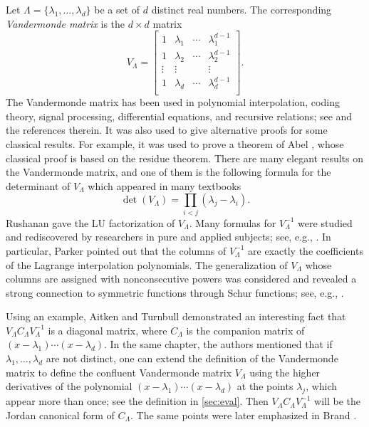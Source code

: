 \documentclass{article}
\theoremstyle{definition}
\begin{document}
Let $\Lambda = \{\lambda_1, \ldots, \lambda_d\}$ be a set of $d$ distinct real numbers.  The corresponding \emph{Vandermonde matrix} is the $d\times d$ matrix
\begin{equation}
\label{eq:vlam}
    V_\Lambda = \begin{bmatrix}
      1 & \lambda_1 & \cdots & \lambda_1^{d-1} \\
      1 & \lambda_2 & \cdots & \lambda_2^{d-1} \\
      \vdots & \vdots & ~ & \vdots \\
      1 & \lambda_d & \cdots & \lambda_d^{d-1} \\
    \end{bmatrix}.
\end{equation}
The Vandermonde matrix has been used in polynomial interpolation, coding theory, signal processing, differential equations, and recursive relations; see \cite{Rushanan89, Kalman84, Eller87, Brand68, MacDuffee50} and the references therein.  It was also used
to give alternative proofs for some classical results. For example, it was used to
prove a theorem of Abel \cite{GT93}, whose classical proof is based on the residue theorem.  
There are many elegant results on the Vandermonde matrix, and one of them is the following formula for the determinant of $V_\Lambda$ which appeared in many textbooks
\begin{equation}
\label{eq:det}
    \det(V_\Lambda) = \prod_{i<j}  (\lambda_j - \lambda_i).
\end{equation}
Rushanan\cite{Rushanan89} gave the LU factorization of $V_\Lambda$.
Many formulas for $V_\Lambda^{-1}$ were studied and rediscovered by researchers in pure and applied subjects; 
see, e.g., \cite{MS58, Klinger67}.  In particular, 
Parker\cite{Parker64} pointed out that the columns of $V_\Lambda^{-1}$ are exactly the coefficients of the Lagrange interpolation polynomials.  The generalization of $V_\Lambda$ whose columns are assigned with nonconsecutive powers was considered and revealed a strong
connection to symmetric functions through Schur functions; see, e.g., \cite{Mitchell1881, Heineman29,  Goodstein70, EI76, dSilva18, 
EPY24, Aitken39}.

Using an example, Aitken and Turnbull \cite[Chapter VI]{AT32} demonstrated an interesting fact that $V_\Lambda C_\Lambda V_\Lambda^{-1}$ is a diagonal matrix, where $C_\Lambda$ 
is the companion matrix of $(x - \lambda_1) \cdots (x - \lambda_d)$.  In the same chapter, the authors mentioned that
if $\lambda_1, \dots, \lambda_d$ are not distinct, 
one can extend the definition of the Vandermonde matrix to define the confluent Vandermonde matrix $V_\Lambda$ using the
higher derivatives of the polynomial $(x-\lambda_1)\cdots (x-\lambda_d)$ at the points $\lambda_j$,
which appear more than once; see the definition in \cref{sec:eval}. Then
$V_\Lambda C_\Lambda V_\Lambda^{-1}$ will be the Jordan canonical form of $C_\Lambda$.  The same points were later emphasized in Brand \cite{Brand64}.  
\end{document}
